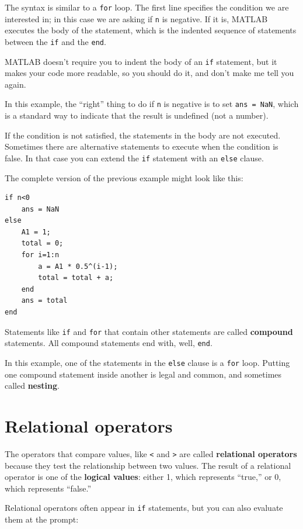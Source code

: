\documentclass[
]{book}
\begin{document}
The syntax is similar to a {\tt for} loop.  The first line
specifies the condition we are interested in; in this case we
are asking if {\tt n} is negative.  If it is, MATLAB executes
the body of the statement, which is the indented sequence of
statements between the {\tt if} and the {\tt end}.

MATLAB doesn't require you to indent the body of an {\tt if}
statement, but it makes your code more readable, so you should do it,
and don't make me tell you again.

In this example, the ``right'' thing to do if {\tt n} is negative
is to set {\tt ans = NaN}, which is a standard way to indicate that
the result is undefined (not a number).

If the condition is not satisfied, the statements in the body are
not executed.  Sometimes there are alternative statements to
execute when the condition is false.  In that case you can extend
the {\tt if} statement with an {\tt else} clause.

The complete version of the previous example might look like this:

\begin{verbatim}
if n<0
    ans = NaN
else
    A1 = 1;
    total = 0;
    for i=1:n
        a = A1 * 0.5^(i-1);
        total = total + a;
    end
    ans = total
end
\end{verbatim}

Statements like {\tt if} and {\tt for} that contain other statements
are called {\bf compound} statements.  All compound statements end
with, well, {\tt end}.

In this example, one of the statements in the {\tt else} clause is a
{\tt for} loop.  Putting one compound statement inside another is
legal and common, and sometimes called {\bf nesting}.


\section{Relational operators}

The operators that compare values, like {\tt <} and {\tt >} are
called {\bf relational operators} because they test the relationship
between two values.  The result of a relational operator is one
of the {\bf logical values}:
either 1, which represents ``true,''  or 0, which represents ``false.''

Relational operators often appear in {\tt if} statements, but you
can also evaluate them at the prompt:
\end{document}
